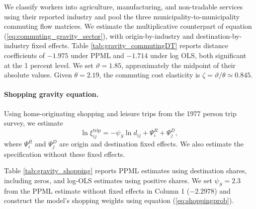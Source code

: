 \documentclass[12pt, unicode, a4paper]{article}
\newcommand{\1}{\mbox{1}\hspace{-0.25em}\mbox{l}} %
\begin{document}
We classify workers into agriculture, manufacturing, and non-tradable services using their reported industry and pool the three municipality-to-municipality commuting flow matrices. We estimate the multiplicative counterpart of equation (\ref{eq:commuting_gravity_sector}), with origin-by-industry and destination-by-industry fixed effects. Table \ref{tab:gravity_commutingDT} reports distance coefficients of $-1.975$ under PPML and $-1.714$ under log OLS, both significant at the 1 percent level. We set $\vartheta=1.85$, approximately the midpoint of their absolute values. Given $\theta=2.19$, the commuting cost elasticity is $\zeta=\vartheta/\theta\simeq0.845$.

\paragraph{Shopping gravity equation.}

Using home-originating shopping and leisure trips from the 1977 person trip survey, we estimate
\begin{equation}
\label{eq:shoppingprob_gravity}
    \ln \xi_{ij}^{\mathrm{trip}} = -\psi_S \ln d_{ij} + \Psi_i^R + \Psi_j^D ,
\end{equation}
where $\Psi_i^R$ and $\Psi_j^D$ are origin and destination fixed effects. We also estimate the specification without these fixed effects.

Table \ref{tab:gravity_shopping} reports PPML estimates using destination shares, including zeros, and log-OLS estimates using positive shares. We set $\psi_S=2.3$ from the PPML estimate without fixed effects in Column 1 ($-2.2978$) and construct the model's shopping weights using equation (\ref{eq:shoppingprob}).

\clearpage
\end{document}
